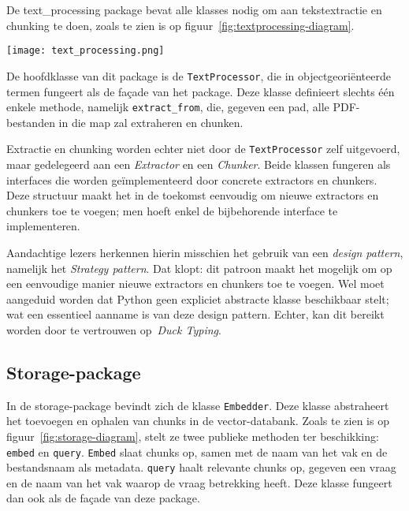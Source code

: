 De text\_processing package bevat alle klasses nodig om aan tekstextractie en chunking te doen, zoals te zien is op figuur~\ref{fig:textprocessing-diagram}. 

\begin{sidewaysfigure}
    \centering
    \texttt{[image: text\_processing.png]}
    \caption[Klassediagram - text\_processing]{\label{fig:textprocessing-diagram}Klassediagram van de text\_processing package}
\end{sidewaysfigure}

De hoofdklasse van dit package is de \texttt{TextProcessor}, die in objectgeoriënteerde termen fungeert als de façade van het package. Deze klasse definieert slechts één enkele methode, namelijk \texttt{extract\_from}, die, gegeven een pad, alle PDF-bestanden in die map zal extraheren en chunken.

Extractie en chunking worden echter niet door de \texttt{TextProcessor} zelf uitgevoerd, maar gedelegeerd aan een \emph{Extractor} en een \emph{Chunker}. Beide klassen fungeren als interfaces die worden geïmplementeerd door concrete extractors en chunkers. Deze structuur maakt het in de toekomst eenvoudig om nieuwe extractors en chunkers toe te voegen; men hoeft enkel de bijbehorende interface te implementeren.

Aandachtige lezers herkennen hierin misschien het gebruik van een \emph{design pattern}, namelijk het \emph{Strategy pattern}. Dat klopt: dit patroon maakt het mogelijk om op een eenvoudige manier nieuwe extractors en chunkers toe te voegen. Wel moet aangeduid worden dat Python geen expliciet abstracte klasse beschikbaar stelt; wat een essentieel aanname is van deze design pattern. Echter, kan dit bereikt worden door te vertrouwen op~\emph{Duck Typing}. 



\subsection{Storage-package}%
\label{subsec:pckg-storage}

In de storage-package bevindt zich de klasse \texttt{Embedder}. Deze klasse abstraheert het toevoegen en ophalen van chunks in de vector-databank. Zoals te zien is op figuur~\ref{fig:storage-diagram}, stelt ze twee publieke methoden ter beschikking: \texttt{embed} en \texttt{query}. \texttt{Embed} slaat chunks op, samen met de naam van het vak en de bestandsnaam als metadata. \texttt{query} haalt relevante chunks op, gegeven een vraag en de naam van het vak waarop de vraag betrekking heeft. Deze klasse fungeert dan ook als de façade van deze package. 

